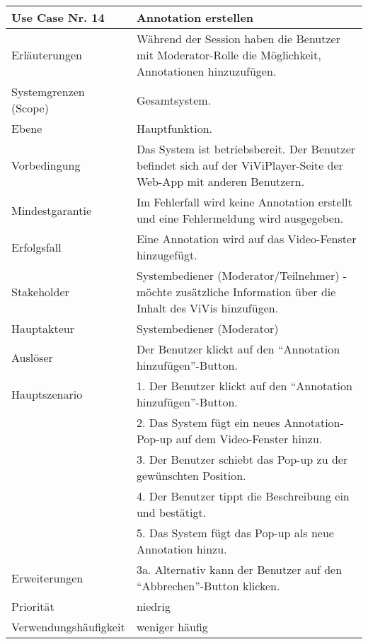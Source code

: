 \begin{tabularx}{\linewidth}{|l|X|}
	\hline
	Use Case Nr. 14			& \textbf{Annotation erstellen} \\ \hline
	Erläuterungen			& Während der Session haben die Benutzer mit Moderator-Rolle die 
							  Möglichkeit, Annotationen hinzuzufügen. \\ \hline
	Systemgrenzen (Scope)	& Gesamtsystem. \\ \hline
	Ebene					& Hauptfunktion. \\ \hline
	Vorbedingung			& Das System ist betriebsbereit. Der Benutzer befindet sich auf 
							  der ViViPlayer-Seite der Web-App mit anderen Benutzern. \\ \hline
	Mindestgarantie			& Im Fehlerfall wird keine Annotation erstellt und eine 
							  Fehlermeldung wird ausgegeben. \\ \hline
	Erfolgsfall				& Eine Annotation wird auf das Video-Fenster hinzugefügt. \\ 
							  \hline
	Stakeholder				& Systembediener (Moderator/Teilnehmer) - möchte zusätzliche 
							  Information über die Inhalt des ViVis hinzufügen. \\ \hline
	Hauptakteur				& Systembediener (Moderator) \\ \hline
	Auslöser				& Der Benutzer klickt auf den ``Annotation hinzufügen''-Button.
							  \\ \hline	
	Hauptszenario			& 1. Der Benutzer klickt auf den ``Annotation hinzufügen''-Button.
							  \\
							& 2. Das System fügt ein neues Annotation-Pop-up auf dem 
							  Video-Fenster hinzu. \\
							& 3. Der Benutzer schiebt das Pop-up zu der gewünschten Position. \\
							& 4. Der Benutzer tippt die Beschreibung ein und bestätigt. \\
							& 5. Das System fügt das Pop-up als neue Annotation hinzu. \\ \hline
	Erweiterungen			& 3a. Alternativ kann der Benutzer auf den ``Abbrechen''-Button 
							 klicken. \\ \hline
	Priorität				& niedrig \\ \hline
	Verwendungshäufigkeit	& weniger häufig  \\ \hline
\end{tabularx}

